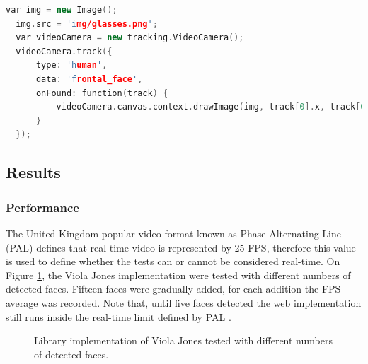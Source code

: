 \begin{lstlisting}[language=C++,label={lst:viola},caption=Example of \textit{tracking.js} API of augmenting users faces with objects using Viola Jones face detection.]
  var img = new Image();
  img.src = 'img/glasses.png';
  var videoCamera = new tracking.VideoCamera();
  videoCamera.track({
      type: 'human',
      data: 'frontal_face',
      onFound: function(track) {
          videoCamera.canvas.context.drawImage(img, track[0].x, track[0].y, track[0].size, track[0].size);
      }
  });
\end{lstlisting}


\subsection{Results} %
\label{sub:evaluation:rapid_object_detection:results}

\subsubsection{Performance} %
\label{subsub:evaluation:rapid_object_detection:results:performance}

The United Kingdom popular video format known as Phase Alternating Line (PAL) \cite{PAL1962} defines that real time video is represented by 25 FPS, therefore this value is used to define whether the tests can or cannot be considered real-time. On Figure \ref{figure:viola_fps}, the Viola Jones implementation were tested with different numbers of detected faces. Fifteen faces were gradually added, for each addition the FPS average was recorded. Note that, until five faces detected the web implementation still runs inside the real-time limit defined by PAL \cite{PAL1962}.

\begin{figure}[!htb]
  \centering
   \caption{Library implementation of Viola Jones tested with different numbers of detected faces.}
   \label{figure:viola_fps}
\end{figure}

